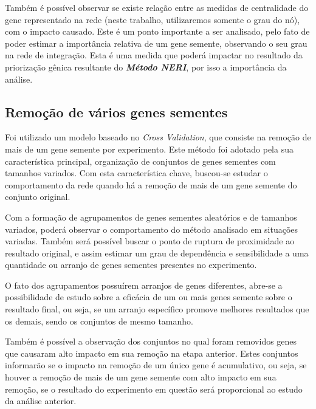 %
Também é possível observar se existe relação entre as medidas de centralidade do gene representado na rede (neste trabalho, utilizaremos somente o grau do nó), com o impacto causado. Este é um ponto importante a ser analisado, pelo fato de poder estimar a importância relativa de um gene semente, observando o seu grau na rede de integração. Esta é uma medida que poderá impactar no resultado da priorização gênica resultante do \textsl{\textbf{Método NERI}}, por isso a importância da análise.




\subsection{Remoção de vários genes sementes}

Foi utilizado um modelo baseado no \textsl{Cross Validation}, que consiste na remoção de mais de um gene semente por experimento.
%
Este método foi adotado pela sua característica principal, organização de conjuntos de genes sementes com tamanhos variados. Com esta característica chave, buscou-se estudar o comportamento da rede quando há a remoção de mais de um gene semente do conjunto original.

%
Com a formação de agrupamentos de genes sementes aleatórios e de tamanhos variados, poderá observar o comportamento do método analisado em situações variadas. Também será possível buscar o ponto de ruptura de proximidade ao resultado original, e assim estimar um grau de dependência e sensibilidade a uma quantidade ou arranjo de genes sementes presentes no experimento.

%
O fato dos agrupamentos possuírem arranjos de genes diferentes, abre-se a possibilidade de estudo sobre a eficácia de um ou mais genes semente sobre o resultado final, ou seja, se um arranjo específico promove melhores resultados que os demais, sendo os conjuntos de mesmo tamanho.

% 
Também é possível a observação dos conjuntos no qual foram removidos genes que causaram alto impacto em sua remoção na etapa anterior. Estes conjuntos informarão se o impacto na remoção de um único gene é acumulativo, ou seja, se houver a remoção de mais de um gene semente com alto impacto em sua remoção, se o resultado do experimento em questão será proporcional ao estudo da análise anterior.

